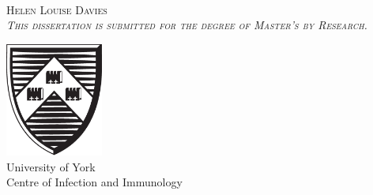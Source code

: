 
{
\pagestyle{empty}

\centering
\null\vfill


\fontsize{36.5}{34}\scshape{}
\\[2cm]%

\fontsize{24}{30}\normalfont
Helen Louise Davies\\[0.5cm]%

\fontsize{13}{16}\itshape
This dissertation is submitted for the degree of Master's by Research.

\vfill

\includegraphics[width=3.2cm]{Figures/Shield.eps}\\[0.6cm]

\fontsize{16}{20}\normalfont
University of York\\
Centre of Infection and Immunology\\[10pt]


\vfill

\fontsize{20}{30}\normalfont
\monthname\space\number\year


\vfill\null

\restoregeometry
}